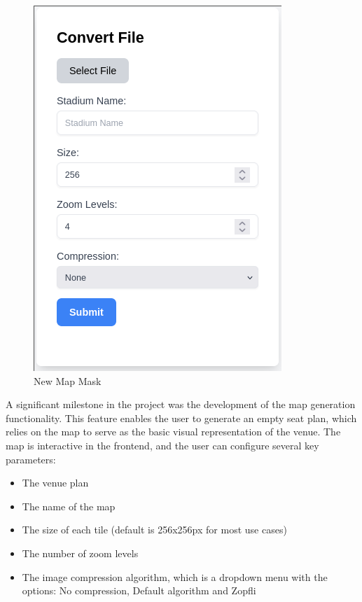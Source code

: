 \begin{figure}
    \begin{center}
        \includegraphics[scale=0.5]{pics/new_map_mask.png}
        \caption{New Map Mask}
        \label{fig:impl:mapgen}
    \end{center}
\end{figure}

A significant milestone in the project was the development of the map generation functionality. This feature enables the user to generate an empty seat plan, which relies on the map to serve as the basic visual representation of the venue. The map is interactive in the frontend, and the user can configure several key parameters:

\begin{itemize} \item The venue plan \item The name of the map \item The size of each tile (default is 256x256px for most use cases) \item The number of zoom levels \item The image compression algorithm, which is a dropdown menu with the options: No compression, Default algorithm and Zopfli \end{itemize}


